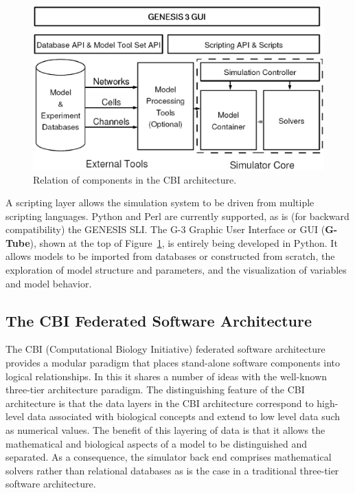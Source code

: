 \documentclass[12pt]{article}
\begin{document}
\begin{figure}[ht]
  \centering
    \includegraphics[scale=0.4]{figures/G3arch.eps}
  \caption{Relation of components in the CBI architecture.}
  \label{fig:cbi-arch}
\end{figure}

A scripting layer allows the simulation system to be driven from
multiple scripting languages. Python and Perl are currently supported,
as is (for backward compatibility) the GENESIS SLI. The G-3 Graphic
User Interface or GUI ({\bf G-Tube}), shown at the top of
Figure~\ref{fig:cbi-arch}, is entirely being developed in Python.  It
allows models to be imported from databases or constructed from
scratch, the exploration of model structure and parameters, and the
visualization of variables and model behavior.

\subsection{The CBI Federated Software Architecture}

The CBI (Computational Biology Initiative) federated software
architecture provides a modular paradigm that places stand-alone
software components into logical relationships.
In this it shares a number of ideas with the well-known three-tier
architecture paradigm\cite{Eckerson1995}.  The distinguishing feature
of the CBI architecture is that the data layers in the CBI
architecture correspond to high-level data associated with biological
concepts and extend to low level data such as numerical values.  The
benefit of this layering of data is that it allows the mathematical
and biological aspects of a model to be distinguished and separated.
As a consequence, the simulator back end comprises mathematical solvers
rather than relational databases as is the case in a traditional
three-tier software architecture.
\end{document}

